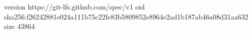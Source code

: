 version https://git-lfs.github.com/spec/v1
oid sha256:f26242881e024a111b75c22fe83b5809852e8964e2ad1b187ab46a08d31aa632
size 43864
